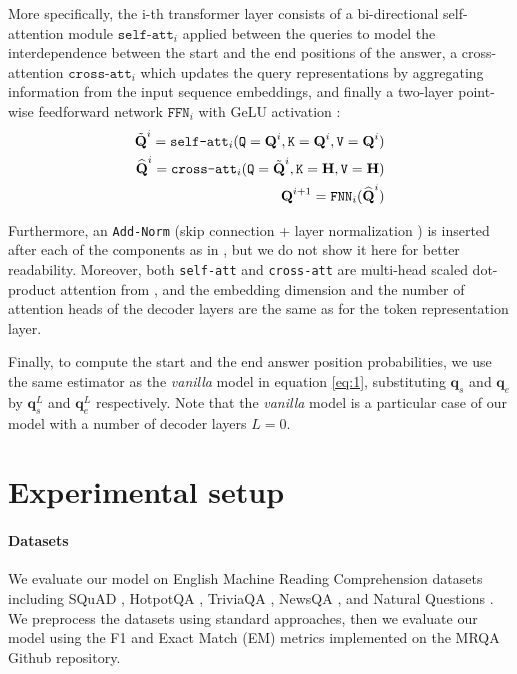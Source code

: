\documentclass{article}
\begin{document}
More specifically, the i-th transformer layer consists of a bi-directional self-attention module $\texttt{self-att}_i$ applied between the queries to model the interdependence between the start and the end positions of the answer, a cross-attention $\texttt{cross-att}_i$ which updates the query representations by aggregating information from the input sequence embeddings, and finally a two-layer point-wise feedforward network $\texttt{FFN}_i$ with GeLU activation \citep{GeLU_act}:
\begin{equation}
    \begin{split}
        \Tilde{\textbf{Q}}^i = \texttt{self-att}_i(\texttt{Q}=\textbf{Q}^i, \texttt{K}=\textbf{Q}^i, \texttt{V}=\textbf{Q}^i) \\
        \widehat{\textbf{Q}}^i = \texttt{cross-att}_i(\texttt{Q}=\Tilde{\textbf{Q}}^i, \texttt{K}=\textbf{H}, \texttt{V}=\textbf{H}) \\
        \textbf{Q}^{i+1} = \texttt{FNN}_i(\widehat{\textbf{Q}}^i)
    \end{split}
\end{equation}

Furthermore, an \texttt{Add-Norm} (skip connection \citep{Resnet} + layer normalization \citep{layernorm}) is inserted after each of the components as in \citet{attention_is_all_u_need}, but we do not show it here for better readability. Moreover, both \texttt{self-att} and \texttt{cross-att} are multi-head scaled dot-product attention from \citet{attention_is_all_u_need}, and the embedding dimension and the number of attention heads of the decoder layers are the same as for the token representation layer.


Finally, to compute the start and the end answer position probabilities, we use the same estimator as the \textit{vanilla} model in equation \ref{eq:1}, substituting $\textbf{q}_s$ and $\textbf{q}_e$ by $\textbf{q}_s^{L}$ and $\textbf{q}_e^{L}$ respectively. Note that the \textit{vanilla} model is a particular case of our model with a number of decoder layers $L=0$.

\section{Experimental setup}
\label{sec:experimental_setup}

\paragraph{Datasets} We evaluate our model on English Machine Reading Comprehension datasets including SQuAD \citep{SQuAD}, HotpotQA \citep{HotpotQA}, TriviaQA \citep{TriviaQA}, NewsQA \citep{NewsQA}, and Natural Questions \citep{NaturalQs}. We preprocess the datasets using standard approaches, then we evaluate our model using the F1 and Exact Match (EM) metrics implemented on the MRQA Github repository.
\end{document}

